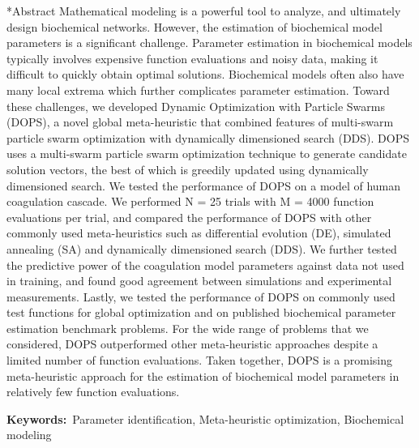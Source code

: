 \documentclass[12pt]{article}
\makeatletter
\renewcommand\section{\@startsection
	{subsection}{2}{0mm}
	{-0.2in}
	{0.05\baselineskip}
	{\normalfont\large\bfseries}}
\makeatother
\begin{document}
\section*{Abstract}
Mathematical modeling is a powerful tool to analyze, and ultimately design biochemical networks.
However, the estimation of biochemical model parameters is a significant challenge.
Parameter estimation in biochemical models typically involves expensive function evaluations and noisy data, making it difficult to quickly obtain optimal solutions.
Biochemical models often also have many local extrema which further complicates parameter estimation.
Toward these challenges, we developed Dynamic Optimization with Particle Swarms (DOPS), a novel global meta-heuristic that combined features of multi-swarm particle swarm optimization with dynamically dimensioned search (DDS).
DOPS uses a multi-swarm particle swarm optimization technique to generate candidate solution vectors, the best of which is greedily updated using dynamically dimensioned search.
We tested the performance of DOPS on a model of human coagulation cascade.
We performed N = 25 trials with M = 4000 function evaluations per trial, and compared the performance of DOPS with other commonly
used meta-heuristics such as differential evolution (DE), simulated annealing (SA) and dynamically dimensioned search (DDS).
We further tested the predictive power of the coagulation model parameters against data not used in training, and found good agreement between simulations and experimental measurements.
Lastly, we tested the performance of DOPS on commonly used test functions for global optimization and on published biochemical parameter estimation benchmark problems.
For the wide range of problems that we considered, DOPS outperformed other meta-heuristic approaches despite a limited number of function evaluations.
Taken together, DOPS is a promising meta-heuristic approach for the estimation of biochemical model parameters in relatively few function evaluations.

\vspace{0.1in}
{\noindent \textbf{Keywords:}~Parameter identification, Meta-heuristic optimization, Biochemical modeling}

\end{document}

